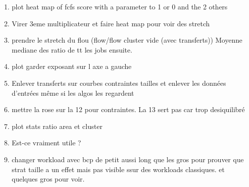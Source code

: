 \documentclass[a4paper]{article}
\begin{document}
\begin{enumerate}
			\item plot heat map of fcfs score with a parameter to 1 or 0 and the 2 others
			\item Virer 3eme multiplicateur et faire heat map pour voir des stretch
			\item prendre le stretch du flou (flow/flow cluster vide (avec transferts)) Moyenne mediane des ratio de tt les jobs ensuite.
			\item plot garder exposant sur l axe a gauche
			\item Enlever transferts sur courbes contraintes tailles et enlever les données d'entrées même si les algos les regardent
			\item mettre la rose sur la 12 pour contraintes. La 13 sert pas car trop desiquilibré
			\item plot stats ratio area et cluster
			\item Est-ce vraiment utile ?
			\item changer workload  avec bcp de petit aussi long que les gros pour prouver que strat taille a un effet mais pas visible ssur des workloads classiques. et quelques gros pour voir.
			

\end{enumerate}
\end{document}

